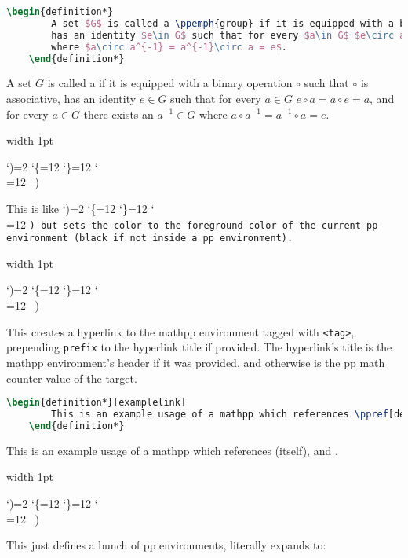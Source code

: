 \documentclass[10pt]{article}
\def\showcase{\medskip\bgroup \color{showcasecolor} \leavevmode\vrule width 1pt \strut \aftergroup\medskip \catcode`)=2 \catcode`\{=12 \catcode`\}=12 \catcode`\\=12 \bftt\ \let\next=}
\def\macrocalls{\bgroup \color{showcasecolor} \catcode`)=2 \catcode`\{=12 \catcode`\}=12 \catcode`\\=12 \tt \let\next=}
\begin{document}
\begin{bluebox}
\begin{lstlisting}[language=tex]
	\begin{definition*}
		A set $G$ is called a \ppemph{group} if it is equipped with a binary operation $\circ$ such that $\circ$ is associative,
		has an identity $e\in G$ such that for every $a\in G$ $e\circ a=a\circ e=a$, and for every $a\in G$ there exists an $a^{-1}\in G$
		where $a\circ a^{-1} = a^{-1}\circ a = e$.
	\end{definition*}
\end{lstlisting}

\begin{definition*}
	A set $G$ is called a  if it is equipped with a binary operation $\circ$ such that $\circ$ is associative,
	has an identity $e\in G$ such that for every $a\in G$ $e\circ a=a\circ e=a$, and for every $a\in G$ there exists an $a^{-1}\in G$
	where $a\circ a^{-1} = a^{-1}\circ a = e$.
\end{definition*}

\showcase()

This is like \macrocalls(\ppemph) but sets the color to the foreground color of the current pp environment (black if not inside a pp
environment).

\showcase()

This creates a hyperlink to the mathpp environment tagged with {\tt <tag>}, prepending {\tt prefix} to the hyperlink title if provided.
The hyperlink's title is the mathpp environment's header if it was provided, and otherwise is the pp math counter value of the target.

\begin{lstlisting}[language=tex]
	\begin{definition*}[examplelink]
		This is an example usage of a mathpp which references \ppref[definition]{examplelink} (itself), and \ppref{evaldefinition}.
	\end{definition*}
\end{lstlisting}

\begin{definition*}[examplelink]
	This is an example usage of a mathpp which references  (itself), and .
\end{definition*}

\showcase(\initpps)

This just defines a bunch of pp environments, literally expands to:


\end{bluebox}
\end{document}
